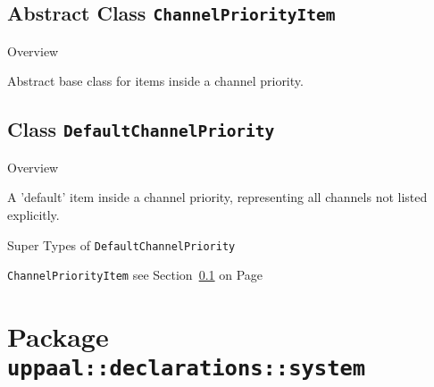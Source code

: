 \subsection{Abstract Class \bfseries \texttt{ChannelPriorityItem}\normalfont}
\label{cls:uppaal::declarations::global::ChannelPriorityItem} 
	
	\begin{longdescription}
		\item[Overview] 		
				

	

		Abstract base class for items inside a channel priority.		
		
	
	
	\end{longdescription}
	

\subsection{Class \bfseries \texttt{DefaultChannelPriority}\normalfont}
\label{cls:uppaal::declarations::global::DefaultChannelPriority} 
	
	\begin{longdescription}
		\item[Overview] 		
				

	

		A 'default' item inside a channel priority, representing all channels not listed explicitly.		
		\item[Super Types of \texttt{DefaultChannelPriority}] ~
			\begin{longdescription}
				\item[\texttt{ChannelPriorityItem}] see Section~\ref{cls:uppaal::declarations::global::ChannelPriorityItem} on Page~\pageref{cls:uppaal::declarations::global::ChannelPriorityItem}						\end{longdescription}
		
	
	
	\end{longdescription}
	
			\newpage
		\section{Package \bfseries \texttt{uppaal::declarations::system}\normalfont}
		
